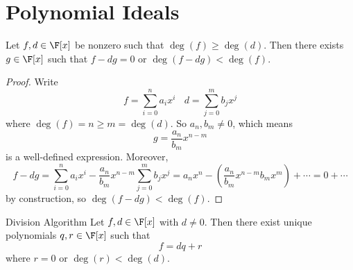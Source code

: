 \documentclass[math_245.tex]{subfiles}
\begin{document}
    \section{Polynomial Ideals}

    \begin{lemma}{}
        Let $f,d\in \F[x]$ be nonzero such that $\deg(f)\geq\deg(d)$. Then there exists $g\in \F[x]$ such that $f-dg = 0$ or $\deg(f-dg) < \deg(f)$.
    \end{lemma}

    \begin{proof}
        Write
        \begin{equation*}
            f = \sum^n_{i=0} a_ix^i \ \ \ \ d = \sum^m_{j=0} b_jx^j
        \end{equation*}
        where $\deg(f) = n \geq m = \deg(d)$. So $a_n, b_m\neq 0$, which means
        \begin{equation*}
            g = \frac{a_n}{b_m}x^{n-m}
        \end{equation*}
        is a well-defined expression. Moreover,
        \begin{equation*}
            f - dg = \sum^n_{i=0} a_ix^i - \frac{a_n}{b_m}x^{n-m} \sum^m_{j=0} b_jx^j = a_nx^n - \left(\frac{a_n}{b_m}x^{n-m} b_mx^m\right) + \cdots = 0 + \cdots
        \end{equation*}
        by construction, so $\deg(f-dg) < \deg(f)$. 
    \end{proof}

    \begin{theorem}{Division Algorithm}
        Let $f,d\in \F[x]$ with $d\neq 0$. Then there exist unique polynomials $q,r\in \F[x]$ such that
        \begin{equation*}
            f = dq+r
        \end{equation*}
        where $r = 0$ or $\deg(r)<\deg(d)$.
    \end{theorem}
\end{document}
